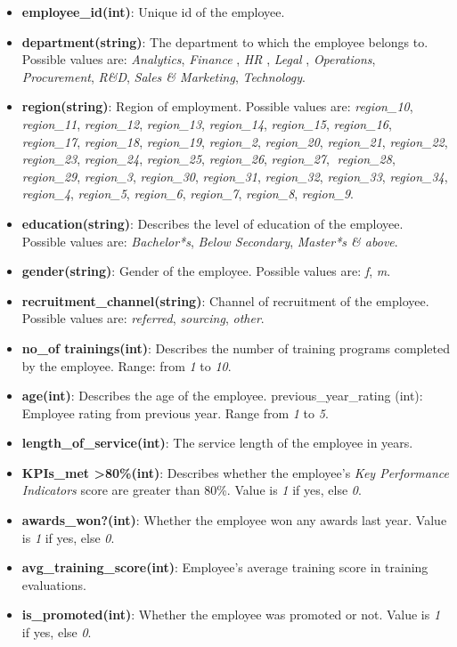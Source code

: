 \documentclass[runningheads]{llncs}
\providecommand{\tightlist}{%
  \setlength{\itemsep}{0pt}\setlength{\parskip}{0pt}}
\begin{document}
\begin{itemize}
\tightlist
\item
  \textbf{employee\_id(int)}: Unique id of the employee.
\item
  \textbf{department(string)}: The department to which the employee
  belongs to. Possible values are: \emph{Analytics}, \emph{Finance} ,
  \emph{HR} , \emph{Legal} , \emph{Operations}, \emph{Procurement},
  \emph{R\&D}, \emph{Sales \& Marketing}, \emph{Technology}.
\item
  \textbf{region(string)}: Region of employment. Possible values are:
  \emph{region\_10}, \emph{region\_11}, \emph{region\_12},
  \emph{region\_13}, \emph{region\_14}, \emph{region\_15},
  \emph{region\_16}, \emph{region\_17}, \emph{region\_18},
  \emph{region\_19}, \emph{region\_2}, \emph{region\_20},
  \emph{region\_21}, \emph{region\_22}, \emph{region\_23},
  \emph{region\_24}, \emph{region\_25}, \emph{region\_26},
  \emph{region\_27}, \emph{region\_28}, \emph{region\_29},
  \emph{region\_3}, \emph{region\_30}, \emph{region\_31},
  \emph{region\_32}, \emph{region\_33}, \emph{region\_34},
  \emph{region\_4}, \emph{region\_5}, \emph{region\_6},
  \emph{region\_7}, \emph{region\_8}, \emph{region\_9}.
\item
  \textbf{education(string)}: Describes the level of education of the
  employee. Possible values are: \emph{Bachelor*s}, \emph{Below
  Secondary}, \emph{Master*s \& above}.
\item
  \textbf{gender(string)}: Gender of the employee. Possible values are:
  \emph{f}, \emph{m}.
\item
  \textbf{recruitment\_channel(string)}: Channel of recruitment of the
  employee. Possible values are: \emph{referred}, \emph{sourcing},
  \emph{other}.
\item
  \textbf{no\_of trainings(int)}: Describes the number of training
  programs completed by the employee. Range: from \emph{1} to \emph{10}.
\item
  \textbf{age(int)}: Describes the age of the employee.
  previous\_year\_rating (int): Employee rating from previous year.
  Range from \emph{1} to \emph{5}.
\item
  \textbf{length\_of\_service(int)}: The service length of the employee
  in years.
\item
  \textbf{KPIs\_met \textgreater80\%(int)}: Describes whether the
  employee's \emph{Key Performance Indicators} score are greater than
  80\%. Value is \emph{1} if yes, else \emph{0}.
\item
  \textbf{awards\_won?(int)}: Whether the employee won any awards last
  year. Value is \emph{1} if yes, else \emph{0}.
\item
  \textbf{avg\_training\_score(int)}: Employee's average training score
  in training evaluations.
\item
  \textbf{is\_promoted(int)}: Whether the employee was promoted or not.
  Value is \emph{1} if yes, else \emph{0}.
\end{itemize}
\end{document}
